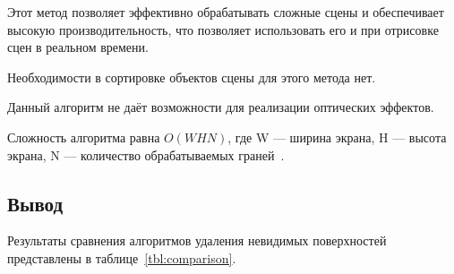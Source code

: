 Этот метод позволяет эффективно обрабатывать сложные сцены и обеспечивает высокую производительность, что позволяет использовать его и при отрисовке сцен в реальном времени.

Необходимости в сортировке объектов сцены для этого метода нет.

Данный алгоритм не даёт возможности для реализации оптических эффектов.

Сложность алгоритма равна $O(WHN)$, где W --- ширина экрана, H --- высота экрана, N --- количество обрабатываемых граней~\cite{Rogers}.

\subsection*{Вывод}

Результаты сравнения алгоритмов удаления невидимых поверхностей представлены в таблице~\ref{tbl:comparison}.


